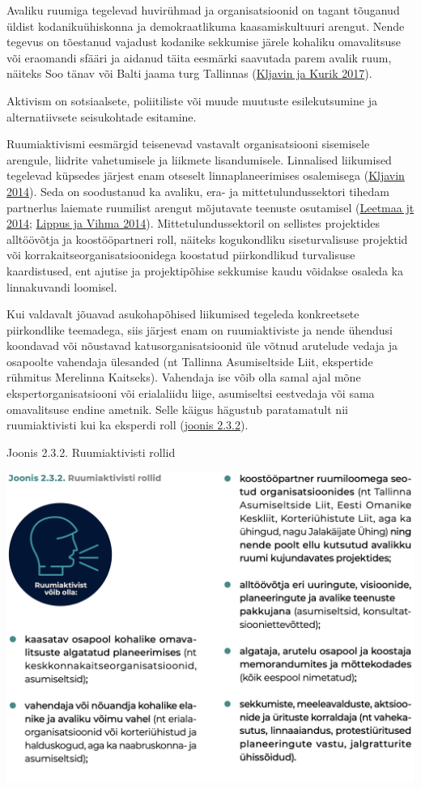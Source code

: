 \documentclass[estonian,]{article}
\begin{document}
Avaliku ruumiga tegelevad huvirühmad ja organisatsioonid on tagant tõuganud üldist kodanikuühiskonna ja demokraatlikuma kaasamiskultuuri arengut. Nende tegevus on tõestanud vajadust kodanike sekkumise järele kohaliku omavalitsuse või eraomandi sfääri ja aidanud täita eesmärki saavutada parem avalik ruum, näiteks Soo tänav või Balti jaama turg Tallinnas (\protect\hyperlink{Kljavin2017}{Kljavin ja Kurik 2017}).

\begin{blockquote-left}
Aktivism on sotsiaalsete, poliitiliste või muude muutuste esilekutsumine
ja alternatiivsete seisukohtade esitamine.
\end{blockquote-left}

Ruumiaktivismi eesmärgid teisenevad vastavalt organisatsiooni sisemisele arengule, liidrite vahetumisele ja liikmete lisandumisele. Linnalised liikumised tegelevad küpsedes järjest enam otseselt linnaplaneerimises osalemisega (\protect\hyperlink{Kljavin2014}{Kljavin 2014}). Seda on soodustanud ka avaliku, era- ja mittetulundussektori tihedam partnerlus laiemate ruumilist arengut mõjutavate teenuste osutamisel (\protect\hyperlink{Leetmaa2014}{Leetmaa jt 2014}; \protect\hyperlink{Lippus2014}{Lippus ja Vihma 2014}). Mittetulundussektoril on sellistes projektides alltöövõtja ja koostööpartneri roll, näiteks kogukondliku siseturvalisuse projektid või korrakaitseorganisatsioonidega koostatud piirkondlikud turvalisuse kaardistused, ent ajutise ja projektipõhise sekkumise kaudu võidakse osaleda ka linnakuvandi loomisel.

Kui valdavalt jõuavad asukohapõhised liikumised tegeleda konkreetsete piirkondlike teemadega, siis järjest enam on ruumiaktiviste ja nende ühendusi koondavad või nõustavad katusorganisatsioonid üle võtnud arutelude vedaja ja osapoolte vahendaja ülesanded (nt Tallinna Asumiseltside Liit, ekspertide rühmitus Merelinna Kaitseks). Vahendaja ise võib olla samal ajal mõne ekspertorganisatsiooni või erialaliidu liige, asumiseltsi eestvedaja või sama omavalitsuse endine ametnik. Selle käigus hägustub paratamatult nii ruumiaktivisti kui ka eksperdi roll (\protect\hyperlink{figure232}{joonis 2.3.2}).

{Joonis 2.3.2.} Ruumiaktivisti rollid

\begin{center}\includegraphics[width=0.8\linewidth]{figures/2-chapter/fig232} \end{center}
\end{document}
